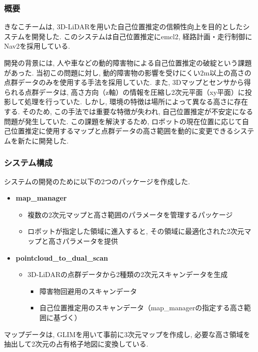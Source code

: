 \subsubsection{概要}
きなこチームは, 3D-LiDARを用いた自己位置推定の信頼性向上を目的としたシステムを開発した. 
このシステムは自己位置推定にemcl2, 経路計画・走行制御にNav2を採用している. 

開発の背景には, 人や車などの動的障害物による自己位置推定の破綻という課題があった. 
当初この問題に対し, 動的障害物の影響を受けにくい2m以上の高さの点群データのみを使用する手法を採用していた. 
また, 3Dマップとセンサから得られる点群データは, 高さ方向（z軸）の情報を圧縮し2次元平面（xy平面）に投影して処理を行っていた. 
しかし, 環境の特徴は場所によって異なる高さに存在する. 
そのため, この手法では重要な特徴が失われ, 自己位置推定が不安定になる問題が発生していた. 
この課題を解決するため, ロボットの現在位置に応じて自己位置推定に使用するマップと点群データの高さ範囲を動的に変更できるシステムを新たに開発した. 

\subsubsection{システム構成}
システムの開発のために以下の2つのパッケージを作成した. 

\begin{itemize}
  \item \textbf{map\_manager}
    \begin{itemize}
      \item 複数の2次元マップと高さ範囲のパラメータを管理するパッケージ
      \item ロボットが指定した領域に進入すると, その領域に最適化された2次元マップと高さパラメータを提供
    \end{itemize}
  \item \textbf{pointcloud\_to\_dual\_scan}
    \begin{itemize}
      \item 3D-LiDARの点群データから2種類の2次元スキャンデータを生成
        \begin{itemize}
          \item 障害物回避用のスキャンデータ
          \item 自己位置推定用のスキャンデータ（map\_managerの指定する高さ範囲に基づく）
        \end{itemize}
    \end{itemize}
\end{itemize}

マップデータは, GLIMを用いて事前に3次元マップを作成し, 必要な高さ領域を抽出して2次元の占有格子地図に変換している. 



